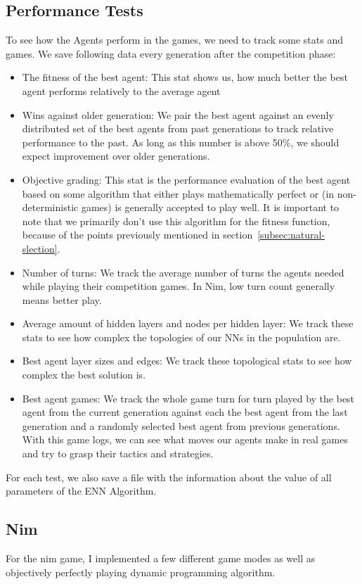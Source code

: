 \documentclass[11pt]{report}
\begin{document}
\begin{enumerate}
            \subsection{Performance Tests}\label{subsec:performance-tests}
    To see how the Agents perform in the games, we need to track some stats and games.
    We save following data every generation after the competition phase:
    \begin{itemize}
        \item The fitness of the best agent: This stat shows us, how much better the best agent performs relatively to the average agent
        \item Wins against older generation: We pair the best agent against an evenly distributed set of the best agents from past generations to track relative performance to the past.
        As long as this number is above 50\%, we should expect improvement over older generations.
        \item Objective grading: This stat is the performance evaluation of the best agent based on some algorithm that either plays mathematically perfect or (in non-deterministic games) is generally accepted to play well.
        It is important to note that we primarily don't use this algorithm for the fitness function, because of the points previously mentioned in section~\ref{subsec:natural-slection}.
        \item Number of turns: We track the average number of turns the agents needed while playing their competition games.
        In Nim, low turn count generally means better play.
        \item Average amount of hidden layers and nodes per hidden layer: We track these stats to see how complex the topologies of our NNs in the population are.
        \item Best agent layer sizes and edges: We track these topological stats to see how complex the best solution is.
        \item Best agent games: We track the whole game turn for turn played by the best agent from the current generation against each the best agent from the last generation and a randomly selected best agent from previous generations.
        With this game logs, we can see what moves our agents make in real games and try to grasp their tactics and strategies.
    \end{itemize}
    For each test, we also save a file with the information about the value of all parameters of the ENN Algorithm.
            \subsection{Nim}\label{subsec:nim2}
    For the nim game, I implemented a few different game modes as well as objectively perfectly playing dynamic programming algorithm.

\end{enumerate}
\end{document}

